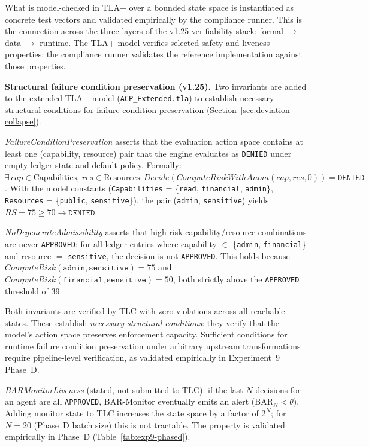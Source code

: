 \documentclass[11pt]{article}
\theoremstyle{definition}
\begin{document}
\noindent What is model-checked in TLA+ over a bounded state space is instantiated
as concrete test vectors and validated empirically by the compliance runner.
This is the connection across the three layers of the v1.25 verifiability stack:
formal $\to$ data $\to$ runtime.
The TLA+ model verifies selected safety and liveness properties; the compliance
runner validates the reference implementation against those properties.

\textbf{Structural failure condition preservation (v1.25).}
Two invariants are added to the extended TLA+ model
(\texttt{ACP\_Extended.tla}) to establish necessary structural conditions for
failure condition preservation (Section~\ref{sec:deviation-collapse}).

\textit{FailureConditionPreservation} asserts that the evaluation action space
contains at least one (capability, resource) pair that the engine evaluates as
\texttt{DENIED} under empty ledger state and default policy.
Formally: $\exists\, \mathit{cap} \in \text{Capabilities},\, \mathit{res} \in \text{Resources} :
\mathit{Decide}(\mathit{ComputeRiskWithAnom}(\mathit{cap}, \mathit{res}, 0)) = \texttt{DENIED}$.
With the model constants (\texttt{Capabilities} = \{\texttt{read}, \texttt{financial}, \texttt{admin}\},
\texttt{Resources} = \{\texttt{public}, \texttt{sensitive}\}),
the pair (\texttt{admin}, \texttt{sensitive}) yields $\mathit{RS} = 75 \geq 70 \to \texttt{DENIED}$.

\textit{NoDegenerateAdmissibility} asserts that high-risk capability/resource
combinations are never \texttt{APPROVED}: for all ledger entries where
capability $\in$ \{\texttt{admin}, \texttt{financial}\} and resource $=$ \texttt{sensitive},
the decision is not \texttt{APPROVED}.
This holds because $\mathit{ComputeRisk}(\texttt{admin}, \texttt{sensitive}) = 75$
and $\mathit{ComputeRisk}(\texttt{financial}, \texttt{sensitive}) = 50$,
both strictly above the \texttt{APPROVED} threshold of 39.

Both invariants are verified by TLC with zero violations across all reachable states.
These establish \emph{necessary structural conditions}: they verify that the model's
action space preserves enforcement capacity.
Sufficient conditions for runtime failure condition preservation under arbitrary
upstream transformations require pipeline-level verification, as validated
empirically in Experiment~9 Phase~D.

\textit{BARMonitorLiveness} (stated, not submitted to TLC): if the last $N$
decisions for an agent are all \texttt{APPROVED}, BAR-Monitor eventually emits
an alert ($\mathrm{BAR}_N < \theta$).
Adding monitor state to TLC increases the state space by a factor of $2^N$;
for $N=20$ (Phase~D batch size) this is not tractable.
The property is validated empirically in Phase~D (Table~\ref{tab:exp9-phased}).
\end{document}
